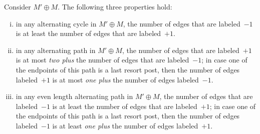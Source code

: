 \documentclass[11pt]{llncs}
\begin{document}
\begin{lemma}
\label{lem:1-3}
Consider $M' \oplus M$. The following three properties hold:
\begin{enumerate}[(i)]
\item\label{le2i} in any alternating cycle in  $M' \oplus M$, the number of edges that are 
labeled~$-1$ is at least the number of edges that are labeled~$+1$.
\item\label{le2ii} in any alternating path in $M' \oplus M$, the number of edges that are 
labeled~$+1$ is at most {\em two plus} the number of edges that are labeled~$-1$; in case one 
of the endpoints of this path is a last resort post, then the number of edges labeled~$+1$ is 
at most {\em one plus} the number of edges labeled~$-1$.
\item\label{le2iii} in any even length alternating path in $M' \oplus M$, the number of edges 
that are labeled~$-1$ is at least the number of edges that are labeled~$+1$;
in case one of the endpoints of this path is a last resort post, then
the number of edges labeled~$-1$ is at least  {\em one plus} the number of edges labeled~$+1$.
\end{enumerate}
\end{lemma}
\end{document}
